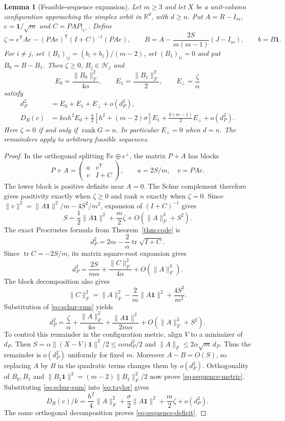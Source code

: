 \documentclass[11pt]{article}
\newtheorem{lemma}[theorem]{Lemma}
\theoremstyle{remark}\newtheorem{remark}[theorem]{Remark}
\newcommand{\R}{\mathbb R}
\newcommand{\one}{\mathbf 1}
\newcommand{\tr}{\operatorname{tr}}
\newcommand{\rank}{\operatorname{rank}}
\begin{document}
\begin{lemma}[Feasible-sequence expansion]\label{rem:quotient}
Let $m\ge3$ and let $X$ be a unit-column configuration approaching the
simplex orbit in $\R^d$, with $d\ge n$. Put $A=R-I_m$, $e=\one/\sqrt m$
and $C=PAP|_{e^\perp}$. Define
\[
 \zeta=e^{\mathsf T}Ae-(PAe)^{\mathsf T}(I+C)^{-1}(PAe),\qquad
 B=A-\frac{2S}{m(m-1)}(J-I_m),\qquad b=B\one.
\]
For $i\ne j$, set $(B_1)_{ij}=(b_i+b_j)/(m-2)$, set $(B_1)_{ii}=0$
and put $B_0=B-B_1$. Then $\zeta\ge0$, $B_j\in\mathcal H_j$ and
\[
 E_0=\frac{\|B_0\|_F^2}{4\alpha},\qquad
 E_1=\frac{\|B_1\|_F^2}{2},\qquad E_\perp=\frac\zeta\alpha
\]
satisfy
\begin{align}
 d_P^2&=E_0+E_1+E_\perp+o(d_P^2),\label{eq:sequence-metric}\\
 D_R(c)&=k\alpha h^2E_0+
 \frac{k}{2}[h^2+(m-2)\sigma]E_1+
 \frac{k(m-1)}2E_\perp+o(d_P^2).\label{eq:sequence-deficit}
\end{align}
Here $\zeta=0$ if and only if $\rank G=n$. In particular $E_\perp=0$
when $d=n$. The remainders apply to arbitrary feasible sequences.
\end{lemma}
\begin{proof}
In the orthogonal splitting $\R e\oplus e^\perp$, the matrix $P+A$ has blocks
\[
 P+A=\begin{pmatrix}a&v^{\mathsf T}\\v&I+C\end{pmatrix},
 \qquad a=2S/m,\quad v=PAe.
\]
The lower block is positive definite near $A=0$. The Schur complement
therefore gives positivity exactly when $\zeta\ge0$ and rank $n$ exactly
when $\zeta=0$. Since $\|v\|^2=\|A\one\|^2/m-4S^2/m^2$, expansion of
$(I+C)^{-1}$ gives
\begin{equation}\label{eq:schur-sum}
 S=\frac12\|A\one\|^2+\frac m2\zeta+
 O(\|A\|_F^3+S^2).
\end{equation}
The exact Procrustes formula from Theorem~\ref{thm:code} is
\[
 d_P^2=2m-\frac2\alpha\tr\sqrt{I+C}.
\]
Since $\tr C=-2S/m$, its matrix square-root expansion gives
\[
 d_P^2=\frac{2S}{m\alpha}+\frac{\|C\|_F^2}{4\alpha}
       +O(\|A\|_F^3).
\]
The block decomposition also gives
\[
 \|C\|_F^2=\|A\|_F^2-\frac2m\|A\one\|^2+
                   \frac{4S^2}{m^2}.
\]
Substitution of \eqref{eq:schur-sum} yields
\begin{equation}\label{eq:schur-metric}
 d_P^2=\frac\zeta\alpha+\frac{\|A\|_F^2}{4\alpha}
       +\frac{\|A\one\|^2}{2m\alpha}
       +O(\|A\|_F^3+S^2).
\end{equation}
To control this remainder in the configuration metric, align $V$ to a
minimizer of $d_P$. Then
$S=\alpha\|(X-V)\one\|^2/2\le\alpha m d_P^2/2$ and
$\|A\|_F\le2\alpha\sqrt m\,d_P$.
Thus the remainder is $o(d_P^2)$ uniformly for fixed $m$.
Moreover $A-B=O(S)$, so replacing $A$ by $B$ in the quadratic terms
changes them by $o(d_P^2)$.
Orthogonality of $B_0,B_1$ and
$\|B_1\one\|^2=(m-2)\|B_1\|_F^2/2$ now prove
\eqref{eq:sequence-metric}.
Substituting \eqref{eq:schur-sum} into \eqref{eq:taylor} gives
\[
 D_R(c)/k=\frac{h^2}{4}\|A\|_F^2+
       \frac\sigma2\|A\one\|^2+\frac m2\zeta+o(d_P^2).
\]
The same orthogonal decomposition proves \eqref{eq:sequence-deficit}.
\end{proof}
\end{document}
